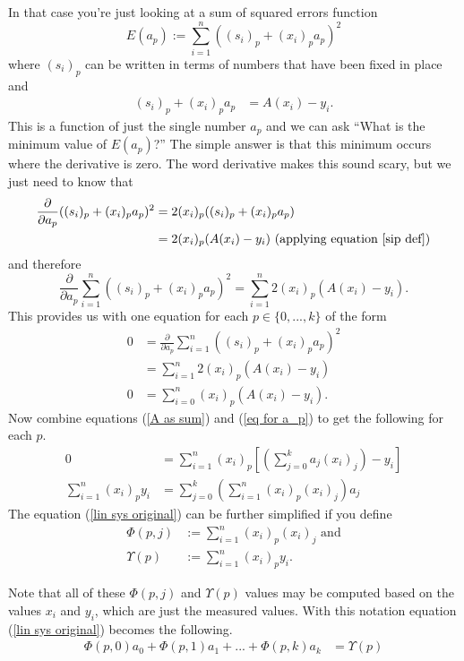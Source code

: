 In that case you're just looking at a sum of squared errors function
$$E(a_p):=\sum_{i=1}^n((s_i)_p + (x_i)_pa_p)^2$$
where $(s_i)_p$ can be written in terms of numbers that have been fixed in place and
\begin{align}
	(s_i)_p+(x_i)_pa_p&=A(x_i) - y_i.\label{sip def}
\end{align}
This is a function of just the single number $a_p$ and we can ask ``What is the minimum value of $E(a_p)$?'' The simple answer is that this minimum occurs where the derivative is zero. The word derivative makes this sound scary, but we just need to know that
\begin{align*}
	\frac{\partial}{\partial a_p}((s_i)_p + (x_i)_pa_p)^2&=2(x_i)_p((s_i)_p + (x_i)_pa_p)\\
	&=2(x_i)_p(A(x_i)-y_i)\text{ (applying equation \ref{sip def})}
\end{align*}
and therefore
$$\frac{\partial}{\partial a_p}\sum_{i=1}^n((s_i)_p + (x_i)_pa_p)^2=\sum_{i=1}^n2(x_i)_p(A(x_i)-y_i).$$
This provides us with one equation for each $p\in\{0,...,k\}$ of the form
\begin{align}
	0&=\frac{\partial}{\partial a_p}\sum_{i=1}^n((s_i)_p + (x_i)_pa_p)^2\\
	&=\sum_{i=1}^n2(x_i)_p(A(x_i)-y_i)\\
	0&=\sum_{i=0}^n(x_i)_p(A(x_i)-y_i).\label{eq for a_p}
\end{align}
Now combine equations (\ref{A as sum}) and (\ref{eq for a_p}) to get the following for each $p$.
\begin{align}
	0&=\sum_{i=1}^n(x_i)_p\left[\left(\sum_{j=0}^{k}a_j(x_i)_j\right)-y_i\right]\\
	\sum_{i=1}^n(x_i)_py_i&=\sum_{j=0}^k\left(\sum_{i=1}^n(x_i)_p(x_i)_j\right)a_j \label{lin sys original}
\end{align}
The equation (\ref{lin sys original}) can be further simplified if you define
\begin{align}
	\Phi(p,j)&:=\sum_{i=1}^n(x_i)_p(x_i)_j\text{ and}\\
	\Upsilon(p)&:=\sum_{i=1}^n(x_i)_py_i.
\end{align}

Note that all of these $\Phi(p,j)$ and $\Upsilon(p)$ values may be computed based on the values $x_i$ and $y_i$, which are just the measured values. With this notation equation (\ref{lin sys original}) becomes the following.
\begin{align}
\Phi(p,0)a_0+\Phi(p,1)a_1+...+\Phi(p,k)a_k&=\Upsilon(p)\label{lin sys}
\end{align}

